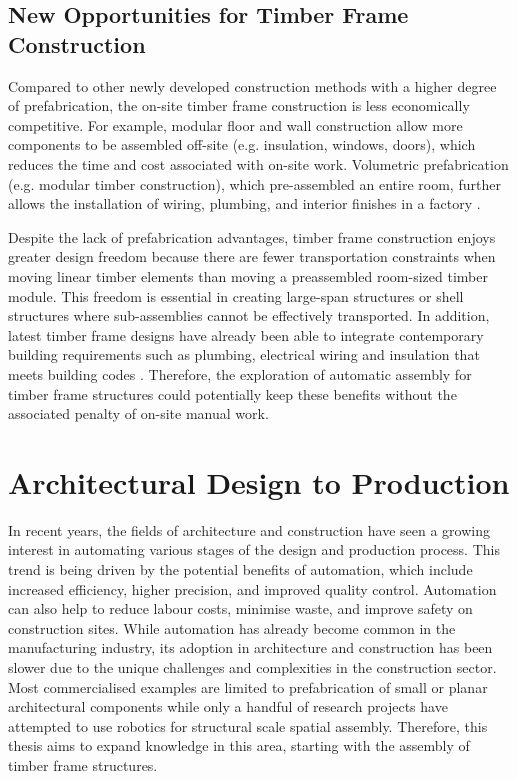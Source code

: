 \subsection{New Opportunities for Timber Frame Construction}
\label{subsection:introduction_new_opportunities_for_timber_frame_construction}

Compared to other newly developed construction methods with a higher degree of prefabrication, the on-site timber frame construction is less economically competitive. For example, modular floor and wall construction allow more components to be assembled off-site (e.g. insulation, windows, doors), which reduces the time and cost associated with on-site work. Volumetric prefabrication (e.g. modular timber construction), which pre-assembled an entire room, further allows the installation of wiring, plumbing, and interior finishes in a factory \parencite{adelDesignRoboticallyFabricated2018}. 

Despite the lack of prefabrication advantages, timber frame construction enjoys greater design freedom because there are fewer transportation constraints when moving linear timber elements than moving a preassembled room-sized timber module. This freedom is essential in creating large-span structures or shell structures where sub-assemblies cannot be effectively transported. In addition, latest timber frame designs have already been able to integrate contemporary building requirements such as plumbing, electrical wiring and insulation that meets building codes \parencite{bensonTimberframeHomeDesign1988}. Therefore, the exploration of automatic assembly for timber frame structures could potentially keep these benefits without the associated penalty of on-site manual work.

\section{Architectural Design to Production}
\label{section:introduction_architectural_design_to_production}

In recent years, the fields of architecture and construction have seen a growing interest in automating various stages of the design and production process. This trend is being driven by the potential benefits of automation, which include increased efficiency, higher precision, and improved quality control. Automation can also help to reduce labour costs, minimise waste, and improve safety on construction sites. While automation has already become common in the manufacturing industry, its adoption in architecture and construction has been slower due to the unique challenges and complexities in the construction sector. Most commercialised examples are limited to prefabrication of small or planar architectural components while only a handful of research projects have attempted to use robotics for structural scale spatial assembly. Therefore, this thesis aims to expand knowledge in this area, starting with the assembly of timber frame structures.

